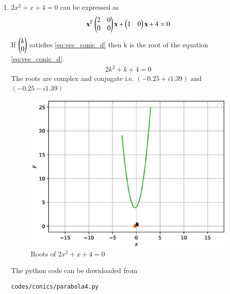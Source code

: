 \begin{enumerate}[label=\thesection.\arabic*.,ref=\thesection.\theenumi]
\begin{enumerate}
\item 
$2x^2 +x + 4 = 0$ can be expressed as 
\begin{align}
\label{eq:vec_conic_d}
\mathbf{x}^T \begin{pmatrix}2 & 0\\0 & 0\end{pmatrix}\mathbf{x}+ \begin{pmatrix}1 & 0\end{pmatrix}\mathbf{x}+4=0
\end{align}
If $\begin{pmatrix}k\\0\end{pmatrix}$ satisfies \ref{eq:vec_conic_d} then k is the root of the equation \eqref{eq:vec_conic_d}.
\begin{align} 
2k^{2}+k+4 = 0
\end{align}
The roots are complex and conjugate i.e. $(-0.25 + i1.39)$ and $(-0.25 - i1.39)$
\begin{figure}[!ht]
\centering
\includegraphics[width= \columnwidth]{./figs/conics/parabola4.eps}
\caption{Roots of $2x^2 +x + 4 = 0$ }
\end{figure}
The python code can be downloaded from
\begin{lstlisting}
codes/conics/parabola4.py
\end{lstlisting}
\end{enumerate}

\end{enumerate}